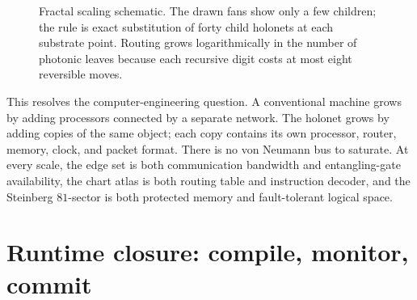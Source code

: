 \documentclass[11pt]{article}
\newcommand{\W}{W(3,3)}
\begin{document}
\begin{figure}[ht]\centering
{}
\caption{Fractal scaling schematic.  The drawn fans show only a few
children; the rule is exact substitution of forty child holonets at
each substrate point.  Routing grows logarithmically in the number of
photonic leaves because each recursive digit costs at most eight
reversible moves.}
\end{figure}

This resolves the computer-engineering question.  A conventional
machine grows by adding processors connected by a separate network.
The holonet grows by adding copies of the same object; each copy
contains its own processor, router, memory, clock, and packet format.
There is no von Neumann bus to saturate.  At every scale, the edge set
is both communication bandwidth and entangling-gate availability, the
chart atlas is both routing table and instruction decoder, and the
Steinberg $81$-sector is both protected memory and fault-tolerant
logical space.

\section{Runtime closure: compile, monitor, commit}
\label{sec:runtimeclosure}
\end{document}
